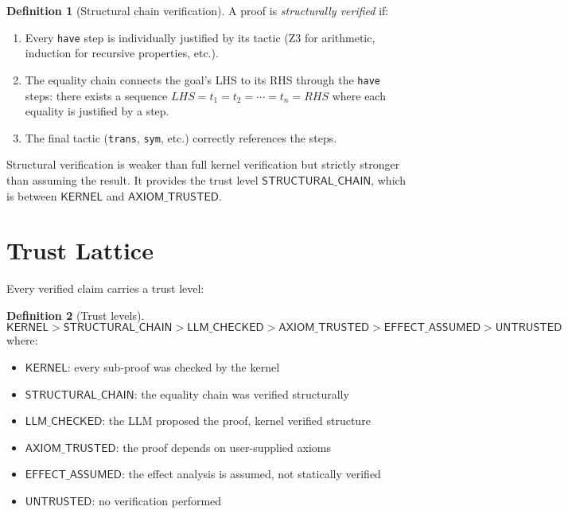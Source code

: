\documentclass[11pt,a4paper]{report}
\theoremstyle{definition}
\newtheorem{definition}{Definition}[chapter]
\theoremstyle{plain}
\begin{document}
\begin{definition}[Structural chain verification]
A proof is \emph{structurally verified} if:
\begin{enumerate}
  \item Every \texttt{have} step is individually justified by its tactic (Z3 for
    arithmetic, induction for recursive properties, etc.).
  \item The equality chain connects the goal's LHS to its RHS through the
    \texttt{have} steps: there exists a sequence $\mathit{LHS} = t_1 = t_2 = \cdots = t_n = \mathit{RHS}$
    where each equality is justified by a step.
  \item The final tactic (\texttt{trans}, \texttt{sym}, etc.) correctly references
    the steps.
\end{enumerate}
\end{definition}

Structural verification is weaker than full kernel verification but strictly
stronger than assuming the result. It provides the trust level
$\mathsf{STRUCTURAL\_CHAIN}$, which is between $\mathsf{KERNEL}$ and
$\mathsf{AXIOM\_TRUSTED}$.


\section{Trust Lattice}
\label{sec:trust-lattice}

Every verified claim carries a trust level:

\begin{definition}[Trust levels]
\[
  \mathsf{KERNEL} > \mathsf{STRUCTURAL\_CHAIN} > \mathsf{LLM\_CHECKED}
    > \mathsf{AXIOM\_TRUSTED} > \mathsf{EFFECT\_ASSUMED} > \mathsf{UNTRUSTED}
\]
where:
\begin{itemize}
  \item $\mathsf{KERNEL}$: every sub-proof was checked by the kernel
  \item $\mathsf{STRUCTURAL\_CHAIN}$: the equality chain was verified structurally
  \item $\mathsf{LLM\_CHECKED}$: the LLM proposed the proof, kernel verified structure
  \item $\mathsf{AXIOM\_TRUSTED}$: the proof depends on user-supplied axioms
  \item $\mathsf{EFFECT\_ASSUMED}$: the effect analysis is assumed, not statically verified
  \item $\mathsf{UNTRUSTED}$: no verification performed
\end{itemize}
\end{definition}
\end{document}
